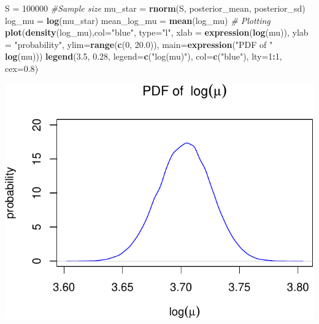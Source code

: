 \documentclass[
]{article}
\newenvironment{Shaded}{\begin{snugshade}}{\end{snugshade}}
\newcommand{\CommentTok}[1]{\textcolor[rgb]{0.56,0.35,0.01}{\textit{#1}}}
\newcommand{\DataTypeTok}[1]{\textcolor[rgb]{0.13,0.29,0.53}{#1}}
\newcommand{\DecValTok}[1]{\textcolor[rgb]{0.00,0.00,0.81}{#1}}
\newcommand{\FloatTok}[1]{\textcolor[rgb]{0.00,0.00,0.81}{#1}}
\newcommand{\KeywordTok}[1]{\textcolor[rgb]{0.13,0.29,0.53}{\textbf{#1}}}
\newcommand{\NormalTok}[1]{#1}
\newcommand{\OperatorTok}[1]{\textcolor[rgb]{0.81,0.36,0.00}{\textbf{#1}}}
\newcommand{\StringTok}[1]{\textcolor[rgb]{0.31,0.60,0.02}{#1}}
\begin{document}
\begin{Shaded}
\begin{Highlighting}[]
\NormalTok{S =}\StringTok{ }\DecValTok{100000} \CommentTok{#Sample size}
\NormalTok{mu_star =}\StringTok{ }\KeywordTok{rnorm}\NormalTok{(S, posterior_mean, posterior_sd)}
\NormalTok{log_mu =}\StringTok{ }\KeywordTok{log}\NormalTok{(mu_star)}
\NormalTok{mean_log_mu =}\StringTok{ }\KeywordTok{mean}\NormalTok{(log_mu)}
\CommentTok{# Plotting}
\KeywordTok{plot}\NormalTok{(}\KeywordTok{density}\NormalTok{(log_mu),}\DataTypeTok{col=}\StringTok{"blue"}\NormalTok{, }\DataTypeTok{type=}\StringTok{"l"}\NormalTok{, }\DataTypeTok{xlab =} \KeywordTok{expression}\NormalTok{(}\KeywordTok{log}\NormalTok{(mu)), }\DataTypeTok{ylab =} \StringTok{"probability"}\NormalTok{, }\DataTypeTok{ylim=}\KeywordTok{range}\NormalTok{(}\KeywordTok{c}\NormalTok{(}\DecValTok{0}\NormalTok{, }\FloatTok{20.0}\NormalTok{)), }\DataTypeTok{main=}\KeywordTok{expression}\NormalTok{(}\StringTok{"PDF of "} \OperatorTok{~}\StringTok{ }\KeywordTok{log}\NormalTok{(mu)))}
\KeywordTok{legend}\NormalTok{(}\FloatTok{3.5}\NormalTok{, }\FloatTok{0.28}\NormalTok{, }\DataTypeTok{legend=}\KeywordTok{c}\NormalTok{(}\StringTok{"log(mu)"}\NormalTok{),}
       \DataTypeTok{col=}\KeywordTok{c}\NormalTok{(}\StringTok{"blue"}\NormalTok{), }\DataTypeTok{lty=}\DecValTok{1}\OperatorTok{:}\DecValTok{1}\NormalTok{, }\DataTypeTok{cex=}\FloatTok{0.8}\NormalTok{)}
\end{Highlighting}
\end{Shaded}

\includegraphics{STAT_205_HW2_files/figure-latex/unnamed-chunk-4-1.pdf}
\end{document}
